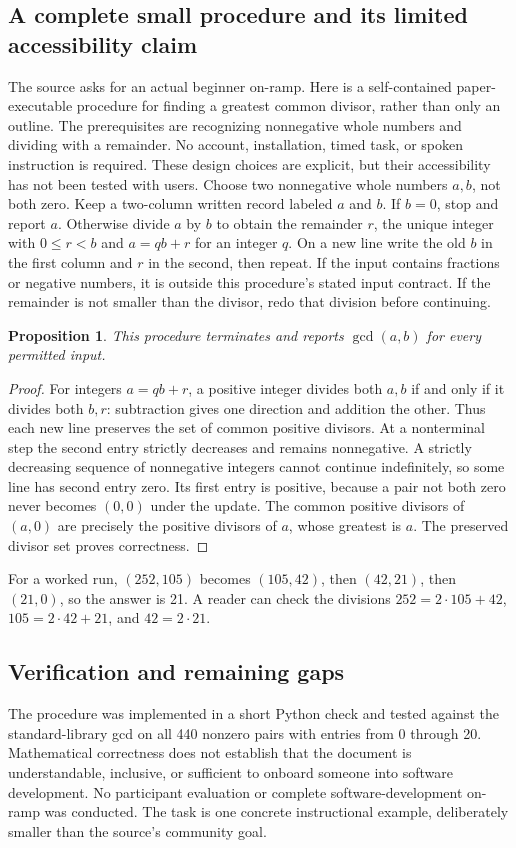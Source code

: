 \documentclass[11pt]{article}
\newtheorem{proposition}{Proposition}
\begin{document}
\subsection{A complete small procedure and its limited accessibility claim}
The source asks for an actual beginner on-ramp. Here is a self-contained paper-executable procedure for finding a greatest common divisor, rather than only an outline. The prerequisites are recognizing nonnegative whole numbers and dividing with a remainder. No account, installation, timed task, or spoken instruction is required. These design choices are explicit, but their accessibility has not been tested with users.
Choose two nonnegative whole numbers $a,b$, not both zero. Keep a two-column written record labeled $a$ and $b$. If $b=0$, stop and report $a$. Otherwise divide $a$ by $b$ to obtain the remainder $r$, the unique integer with $0\le r<b$ and $a=qb+r$ for an integer $q$. On a new line write the old $b$ in the first column and $r$ in the second, then repeat. If the input contains fractions or negative numbers, it is outside this procedure's stated input contract. If the remainder is not smaller than the divisor, redo that division before continuing.
\begin{proposition}
This procedure terminates and reports $\gcd(a,b)$ for every permitted input.
\end{proposition}
\begin{proof}
For integers $a=qb+r$, a positive integer divides both $a,b$ if and only if it divides both $b,r$: subtraction gives one direction and addition the other. Thus each new line preserves the set of common positive divisors. At a nonterminal step the second entry strictly decreases and remains nonnegative. A strictly decreasing sequence of nonnegative integers cannot continue indefinitely, so some line has second entry zero. Its first entry is positive, because a pair not both zero never becomes $(0,0)$ under the update. The common positive divisors of $(a,0)$ are precisely the positive divisors of $a$, whose greatest is $a$. The preserved divisor set proves correctness.
\end{proof}
For a worked run, $(252,105)$ becomes $(105,42)$, then $(42,21)$, then $(21,0)$, so the answer is 21. A reader can check the divisions $252=2\cdot105+42$, $105=2\cdot42+21$, and $42=2\cdot21$.
\subsection{Verification and remaining gaps}
The procedure was implemented in a short Python check and tested against the standard-library gcd on all 440 nonzero pairs with entries from 0 through 20. Mathematical correctness does not establish that the document is understandable, inclusive, or sufficient to onboard someone into software development. No participant evaluation or complete software-development on-ramp was conducted. The task is one concrete instructional example, deliberately smaller than the source's community goal.
\end{document}
